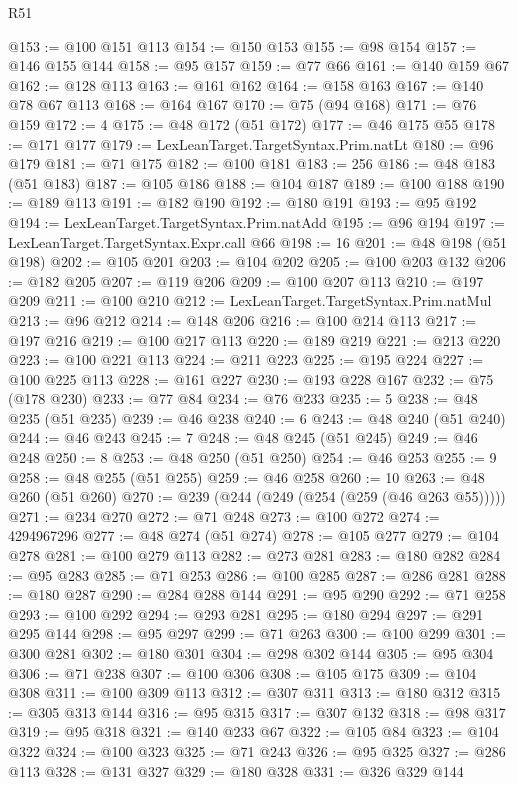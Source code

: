 \begin{lexlean}{R51}
\begin{coremodule}
@153 := @100 @151 @113
@154 := @150 @153
@155 := @98 @154
@157 := @146 @155 @144
@158 := @95 @157
@159 := @77 @66
@161 := @140 @159 @67
@162 := @128 @113
@163 := @161 @162
@164 := @158 @163
@167 := @140 @78 @67 @113
@168 := @164 @167
@170 := @75 (@94 @168)
@171 := @76 @159
@172 := 4
@175 := @48 @172 (@51 @172)
@177 := @46 @175 @55
@178 := @171 @177
@179 := LexLeanTarget.TargetSyntax.Prim.natLt
@180 := @96 @179
@181 := @71 @175
@182 := @100 @181
@183 := 256
@186 := @48 @183 (@51 @183)
@187 := @105 @186
@188 := @104 @187
@189 := @100 @188
@190 := @189 @113
@191 := @182 @190
@192 := @180 @191
@193 := @95 @192
@194 := LexLeanTarget.TargetSyntax.Prim.natAdd
@195 := @96 @194
@197 := LexLeanTarget.TargetSyntax.Expr.call @66
@198 := 16
@201 := @48 @198 (@51 @198)
@202 := @105 @201
@203 := @104 @202
@205 := @100 @203 @132
@206 := @182 @205
@207 := @119 @206
@209 := @100 @207 @113
@210 := @197 @209
@211 := @100 @210
@212 := LexLeanTarget.TargetSyntax.Prim.natMul
@213 := @96 @212
@214 := @148 @206
@216 := @100 @214 @113
@217 := @197 @216
@219 := @100 @217 @113
@220 := @189 @219
@221 := @213 @220
@223 := @100 @221 @113
@224 := @211 @223
@225 := @195 @224
@227 := @100 @225 @113
@228 := @161 @227
@230 := @193 @228 @167
@232 := @75 (@178 @230)
@233 := @77 @84
@234 := @76 @233
@235 := 5
@238 := @48 @235 (@51 @235)
@239 := @46 @238
@240 := 6
@243 := @48 @240 (@51 @240)
@244 := @46 @243
@245 := 7
@248 := @48 @245 (@51 @245)
@249 := @46 @248
@250 := 8
@253 := @48 @250 (@51 @250)
@254 := @46 @253
@255 := 9
@258 := @48 @255 (@51 @255)
@259 := @46 @258
@260 := 10
@263 := @48 @260 (@51 @260)
@270 := @239 (@244 (@249 (@254 (@259 (@46 @263 @55)))))
@271 := @234 @270
@272 := @71 @248
@273 := @100 @272
@274 := 4294967296
@277 := @48 @274 (@51 @274)
@278 := @105 @277
@279 := @104 @278
@281 := @100 @279 @113
@282 := @273 @281
@283 := @180 @282
@284 := @95 @283
@285 := @71 @253
@286 := @100 @285
@287 := @286 @281
@288 := @180 @287
@290 := @284 @288 @144
@291 := @95 @290
@292 := @71 @258
@293 := @100 @292
@294 := @293 @281
@295 := @180 @294
@297 := @291 @295 @144
@298 := @95 @297
@299 := @71 @263
@300 := @100 @299
@301 := @300 @281
@302 := @180 @301
@304 := @298 @302 @144
@305 := @95 @304
@306 := @71 @238
@307 := @100 @306
@308 := @105 @175
@309 := @104 @308
@311 := @100 @309 @113
@312 := @307 @311
@313 := @180 @312
@315 := @305 @313 @144
@316 := @95 @315
@317 := @307 @132
@318 := @98 @317
@319 := @95 @318
@321 := @140 @233 @67
@322 := @105 @84
@323 := @104 @322
@324 := @100 @323
@325 := @71 @243
@326 := @95 @325
@327 := @286 @113
@328 := @131 @327
@329 := @180 @328
@331 := @326 @329 @144

\end{coremodule}
\end{lexlean}
